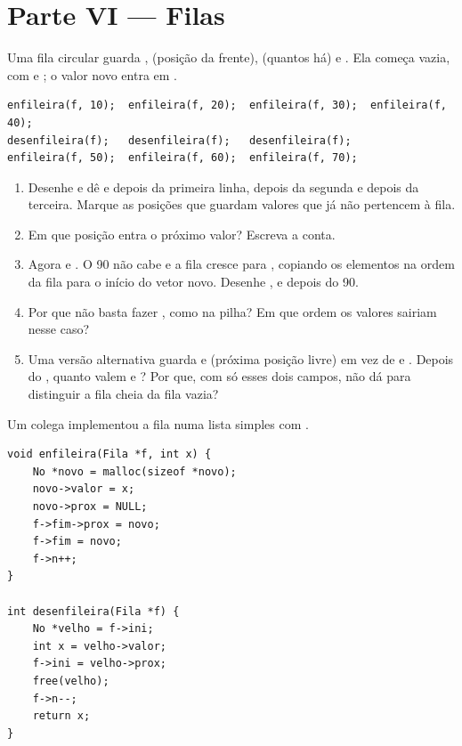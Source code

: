 \documentclass[11pt,a4paper]{article}
\begin{document}
\section{Parte VI --- Filas}

Uma fila circular guarda ,  (posição da frente),  (quantos há) e
. Ela começa vazia, com  e ; o valor novo entra em
.

\begin{lstlisting}
enfileira(f, 10);  enfileira(f, 20);  enfileira(f, 30);  enfileira(f, 40);
desenfileira(f);   desenfileira(f);   desenfileira(f);
enfileira(f, 50);  enfileira(f, 60);  enfileira(f, 70);
\end{lstlisting}

\begin{enumerate}[label=(\alph*),leftmargin=1.8em,itemsep=1pt]
  \item Desenhe  e dê  e  depois da primeira linha, depois
        da segunda e depois da terceira. Marque as posições que guardam valores que
        já não pertencem à fila.
  \item Em que posição entra o próximo valor? Escreva a conta.
  \item Agora  e . O 90 não cabe e a fila
        cresce para , copiando os elementos na ordem da fila para o
        início do vetor novo. Desenhe ,  e  depois do 90.
  \item Por que não basta fazer , como na pilha?
        Em que ordem os valores sairiam nesse caso?
  \item Uma versão alternativa guarda  e  (próxima posição livre) em
        vez de  e . Depois do , quanto valem
         e ? Por que, com só esses dois campos, não dá para
        distinguir a fila cheia da fila vazia?
\end{enumerate}

Um colega implementou a fila numa lista simples com .

\begin{lstlisting}
void enfileira(Fila *f, int x) {
    No *novo = malloc(sizeof *novo);
    novo->valor = x;
    novo->prox = NULL;
    f->fim->prox = novo;
    f->fim = novo;
    f->n++;
}

int desenfileira(Fila *f) {
    No *velho = f->ini;
    int x = velho->valor;
    f->ini = velho->prox;
    free(velho);
    f->n--;
    return x;
}
\end{lstlisting}
\end{document}
